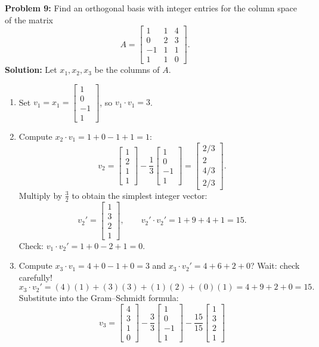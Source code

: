\documentclass[11pt, letterpaper]{article}
\theoremstyle{definition}
\theoremstyle{remark}
\begin{document}
\textbf{Problem 9:} Find an orthogonal basis with integer entries for the column space of the matrix
\[
    A = \begin{bmatrix}
        1 & 1 & 4 \\
        0 & 2 & 3 \\
        -1 & 1 & 1 \\
        1 & 1 & 0
    \end{bmatrix}.
\]
\textbf{Solution:} Let $x_1, x_2, x_3$ be the columns of $A$.
\begin{enumerate}[label=\textbf{Step \arabic*:}]
    \item Set $v_1 = x_1 = \begin{bmatrix} 1 \\ 0 \\ -1 \\ 1 \end{bmatrix}$, so $v_1 \cdot v_1 = 3$.
    \item Compute $x_2 \cdot v_1 = 1 + 0 - 1 + 1 = 1$:
    \[
        v_2 = \begin{bmatrix} 1 \\ 2 \\ 1 \\ 1 \end{bmatrix} - \frac{1}{3}\begin{bmatrix} 1 \\ 0 \\ -1 \\ 1 \end{bmatrix} = \begin{bmatrix} 2/3 \\ 2 \\ 4/3 \\ 2/3 \end{bmatrix}.
    \]
    Multiply by $\frac{3}{2}$ to obtain the simplest integer vector:
    \[
        v_2' = \begin{bmatrix} 1 \\ 3 \\ 2 \\ 1 \end{bmatrix}, \qquad v_2' \cdot v_2' = 1 + 9 + 4 + 1 = 15.
    \]
    Check: $v_1 \cdot v_2' = 1 + 0 - 2 + 1 = 0$.
    \item Compute $x_3 \cdot v_1 = 4 + 0 - 1 + 0 = 3$ and $x_3 \cdot v_2' = 4 + 6 + 2 + 0$? Wait: check carefully!
    \[
        x_3 \cdot v_2' = (4)(1) + (3)(3) + (1)(2) + (0)(1) = 4 + 9 + 2 + 0 = 15.
    \]
    Substitute into the Gram--Schmidt formula:
    \[
        v_3 = \begin{bmatrix} 4 \\ 3 \\ 1 \\ 0 \end{bmatrix} - \frac{3}{3}\begin{bmatrix} 1 \\ 0 \\ -1 \\ 1 \end{bmatrix} - \frac{15}{15}\begin{bmatrix} 1 \\ 3 \\ 2 \\ 1 \end{bmatrix}
\]
\end{enumerate}
\end{document}

